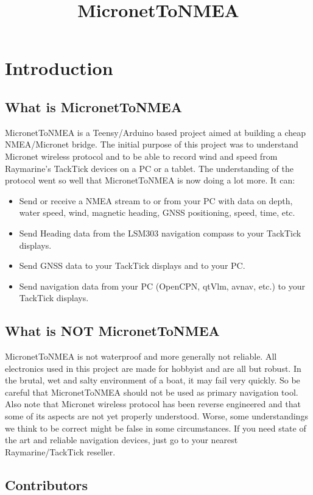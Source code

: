 \documentclass{report}
\begin{document}
\title{MicronetToNMEA}

\chapter {Introduction}

\section{What is MicronetToNMEA}

MicronetToNMEA is a Teensy/Arduino based project aimed at building a cheap NMEA/Micronet bridge. The initial purpose of this project was to understand Micronet wireless protocol and to be able to record wind and speed from Raymarine's TackTick devices on a PC or a tablet. The understanding of the protocol went so well that MicronetToNMEA is now doing a lot more. It can:

\begin{itemize}
\item Send or receive a NMEA stream to or from your PC with data on depth, water speed, wind, magnetic heading, GNSS positioning, speed, time, etc.
\item Send Heading data from the LSM303 navigation compass to your TackTick displays.
\item Send GNSS data to your TackTick displays and to your PC.
\item Send navigation data from your PC (OpenCPN, qtVlm, avnav, etc.) to your TackTick displays.
\end{itemize}

\section{What is NOT MicronetToNMEA}

MicronetToNMEA is not waterproof and more generally not reliable. All electronics used in this project are made for hobbyist and are all but robust. In the brutal, wet and salty environment of a boat, it may fail very quickly. So be careful that MicronetToNMEA should not be used as primary navigation tool. Also note that Micronet wireless protocol has been reverse engineered and that some of its aspects are not yet properly understood. Worse, some understandings we think to be correct might be false in some circumstances. If you need state of the art and reliable navigation devices, just go to your nearest Raymarine/TackTick reseller.

\section{Contributors}
\end{document}
